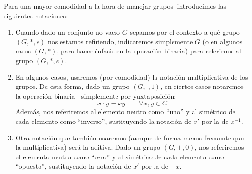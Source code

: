 \begin{notacion}
    Para una mayor comodidad a la hora de manejar grupos, introducimos las siguientes notaciones:
    \begin{enumerate}
        \item Cuando dado un conjunto no vacío $G$ sepamos por el contexto a qué grupo $(G,\ast,e)$ nos estamos refiriendo, indicaremos simplemente $G$ (o en algunos casos $(G,\ast)$, para hacer énfasis en la operación binaria) para referirnos al grupo $(G,\ast,e)$.
        \item En algunos casos, usaremos (por comodidad) la notación multiplicativa de los grupos. De esta forma, dado un grupo $(G,\cdot,1)$, en ciertos casos notaremos la operación binaria $\cdot$ simplemente por yuxtaposición:
            \begin{equation*}
                x \cdot y = xy \qquad \forall x,y\in G
            \end{equation*}
            Además, nos referiremos al elemento neutro como ``uno'' y al simétrico de cada elemento como ``inverso'', sustituyendo la notación de $x'$ por la de $x^{-1}$.
        \item Otra notación que también usaremos (aunque de forma menos frecuente que la multiplicativa) será la aditiva. Dado un grupo $(G,+,0)$, nos referiremos al elemento neutro como ``cero'' y al simétrico de cada elemento como ``opuesto'', sustituyendo la notación de $x'$ por la de $-x$.
    \end{enumerate}
\end{notacion}

